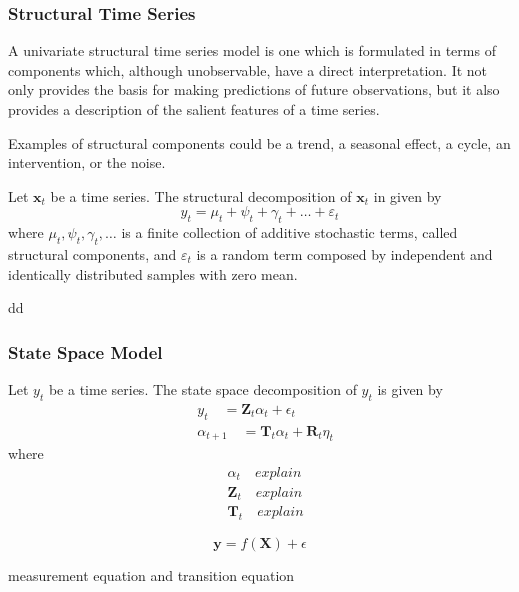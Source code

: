 \subsubsection{Structural Time Series}

{\color{red} A univariate structural time series model is one which is formulated in terms of components which, although unobservable, have a direct interpretation. It not only provides the basis for making predictions of future observations, but it also provides a description of the salient features of a time series.}

Examples of structural components could be a trend, a seasonal effect, a cycle, an intervention, or the noise.

\begin{definition}
Let $\mathbf{x}_t$ be a time series. The structural decomposition of $\mathbf{x}_t$ in given by
\[
y_t = \mu_t + \psi_t + \gamma_t + \ldots + \varepsilon_t
\]
where $\mu_t, \psi_t, \gamma_t, \ldots$ is a finite collection of additive stochastic terms, called structural components, and $\varepsilon_t$ is a random term composed by independent and identically distributed samples with zero mean. 
\end{definition}

\begin{example}
dd
\end{example}

\subsubsection{State Space Model}

\begin{definition}
Let $y_t$ be a time series. The state space decomposition of $y_t$ is given by
\begin{align*}
    & y_t          \quad = \mathbf{Z}_t \alpha_t + \epsilon_t \\
    & \alpha_{t+1} \quad = \mathbf{T}_t \alpha_t + \mathbf{R}_t \eta_t
\end{align*}
where
\begin{align*}
    & \alpha_t     \quad explain \\
    & \mathbf{Z}_t \quad explain \\
    & \mathbf{T}_t \quad explain
\end{align*}

\begin{equation}
    \label{eq:measurement_equation}
    \mathbf{y} = f\left( \mathbf{X} \right) + \epsilon
\end{equation}

measurement equation and transition equation

\end{definition}

